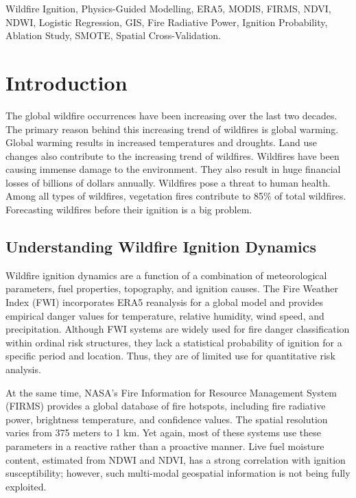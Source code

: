 \documentclass[conference]{IEEEtran}
\begin{document}
\begin{IEEEkeywords}
Wildfire Ignition, Physics-Guided Modelling, ERA5, MODIS, FIRMS, NDVI, NDWI,
Logistic Regression, GIS, Fire Radiative Power, Ignition Probability, Ablation Study,
SMOTE, Spatial Cross-Validation.
\end{IEEEkeywords}

\section{Introduction}

The global wildfire occurrences have been increasing over the last two decades. The primary reason behind this increasing trend of wildfires is global warming. Global warming results in increased temperatures and droughts. Land use changes also contribute to the increasing trend of wildfires. Wildfires have been causing immense damage to the environment. They also result in huge financial losses of billions of dollars annually. Wildfires pose a threat to human health. Among all types of wildfires, vegetation fires contribute to 85\% of total wildfires. Forecasting wildfires before their ignition is a big problem.

\subsection{Understanding Wildfire Ignition Dynamics}

Wildfire ignition dynamics are a function of a combination of meteorological parameters, fuel properties, topography, and ignition causes. The Fire Weather Index (FWI) incorporates ERA5 reanalysis for a global model and provides empirical danger values for temperature, relative humidity, wind speed, and precipitation. Although FWI systems are widely used for fire danger classification within ordinal risk structures, they lack a statistical probability of ignition for a specific period and location. Thus, they are of limited use for quantitative risk analysis.

At the same time, NASA's Fire Information for Resource Management System (FIRMS) provides a global database of fire hotspots, including fire radiative power, brightness temperature, and confidence values. The spatial resolution varies from 375 meters to 1 km. Yet again, most of these systems use these parameters in a reactive rather than a proactive manner. Live fuel moisture content, estimated from NDWI and NDVI, has a strong correlation with ignition susceptibility; however, such multi-modal geospatial information is not being fully exploited.
\end{document}
